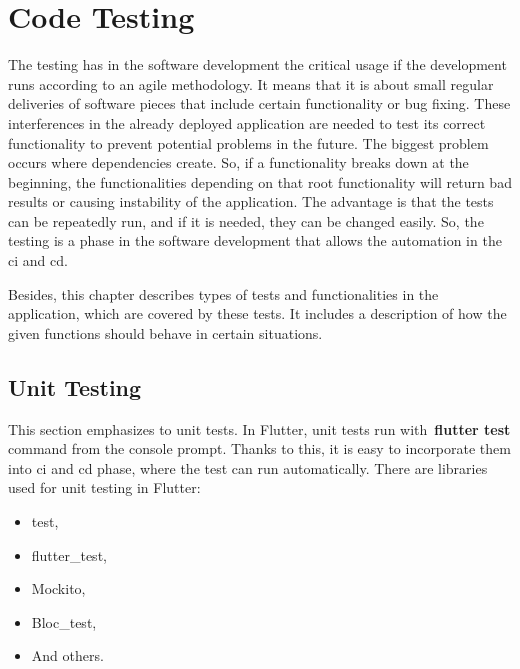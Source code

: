 \section{Code Testing}\label{sec:code-testing}
The testing has in the software development the critical usage if the development runs according to an agile methodology.
It means that it is about small regular deliveries of software pieces that include certain functionality or bug fixing.
These interferences in the already deployed application are needed to test its correct functionality to prevent potential problems in the future.
The biggest problem occurs where dependencies create.
So, if a functionality breaks down at the beginning, the functionalities depending on that root functionality will return bad results or causing instability of the application.
The advantage is that the tests can be repeatedly run, and if it is needed, they can be changed easily.
So, the testing is a phase in the software development that allows the automation in the \acrshort{ci} and \acrshort{cd}.

Besides, this chapter describes types of tests and functionalities in the application, which are covered by these tests.
It includes a description of how the given functions should behave in certain situations.


\subsection{Unit Testing}\label{subsec:unit-testing}
This section emphasizes to unit tests.
In Flutter, unit tests run with~\textbf{flutter test} command from the console prompt.
Thanks to this, it is easy to incorporate them into \acrshort{ci} and \acrshort{cd} phase, where the test can run automatically.
There are libraries used for unit testing in Flutter:
\begin{itemize}
    \item test,
    \item flutter\_test,
    \item Mockito,
    \item Bloc\_test,
    \item And others.
\end{itemize}

